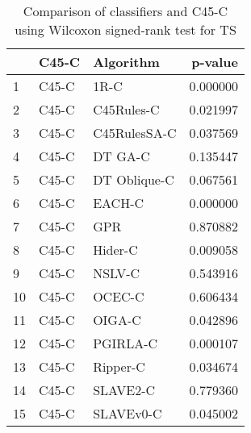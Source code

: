 \begin{table}
\footnotesize
\caption{Comparison of classifiers and C45-C using Wilcoxon signed-rank test for TS}
\label{tab:C45-C wilcoxon TS comparison}
\begin{tabular}{lllr}
\hline
 & C45-C & Algorithm & p-value \\
\hline
1 & C45-C & 1R-C & 0.000000 \\
2 & C45-C & C45Rules-C & 0.021997 \\
3 & C45-C & C45RulesSA-C & 0.037569 \\
4 & C45-C & DT GA-C & 0.135447 \\
5 & C45-C & DT Oblique-C & 0.067561 \\
6 & C45-C & EACH-C & 0.000000 \\
7 & C45-C & GPR & 0.870882 \\
8 & C45-C & Hider-C & 0.009058 \\
9 & C45-C & NSLV-C & 0.543916 \\
10 & C45-C & OCEC-C & 0.606434 \\
11 & C45-C & OIGA-C & 0.042896 \\
12 & C45-C & PGIRLA-C & 0.000107 \\
13 & C45-C & Ripper-C & 0.034674 \\
14 & C45-C & SLAVE2-C & 0.779360 \\
15 & C45-C & SLAVEv0-C & 0.045002 \\
\hline
\end{tabular}
\end{table}
